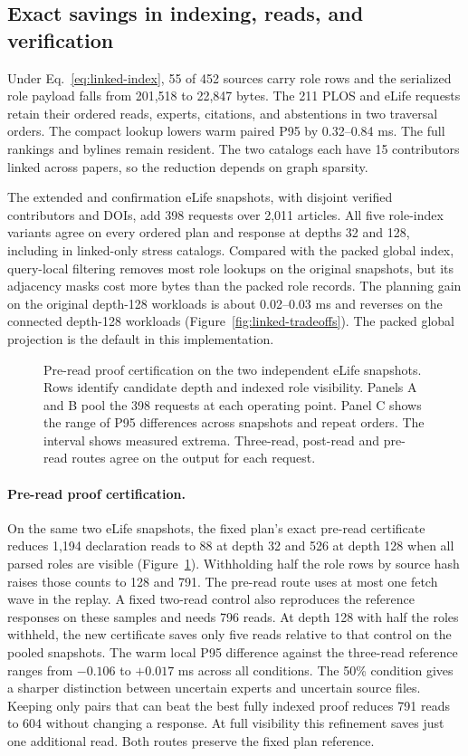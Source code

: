\documentclass[sigconf,natbib=true,anonymous=true,pbalance=true]{acmart}
\begin{document}
\subsection{Exact savings in indexing, reads, and verification}
Under Eq.~\ref{eq:linked-index}, 55 of 452 sources carry role rows and the serialized role payload falls from 201,518 to 22,847 bytes. The 211 PLOS and eLife requests retain their ordered reads, experts, citations, and abstentions in two traversal orders. The compact lookup lowers warm paired P95 by 0.32--0.84 ms. The full rankings and bylines remain resident. The two catalogs each have 15 contributors linked across papers, so the reduction depends on graph sparsity.

The extended and confirmation eLife snapshots, with disjoint verified contributors and DOIs, add 398 requests over 2,011 articles. All five role-index variants agree on every ordered plan and response at depths 32 and 128, including in linked-only stress catalogs. Compared with the packed global index, query-local filtering removes most role lookups on the original snapshots, but its adjacency masks cost more bytes than the packed role records. The planning gain on the original depth-128 workloads is about 0.02--0.03 ms and reverses on the connected depth-128 workloads (Figure~\ref{fig:linked-tradeoffs}). The packed global projection is the default in this implementation.

\begin{figure}[t]
\centering

\caption{Pre-read proof certification on the two independent eLife snapshots. Rows identify candidate depth and indexed role visibility. Panels A and B pool the 398 requests at each operating point. Panel C shows the range of P95 differences across snapshots and repeat orders. The interval shows measured extrema. Three-read, post-read and pre-read routes agree on the output for each request.}
\label{fig:pre-read}
\end{figure}

\paragraph{Pre-read proof certification.}
On the same two eLife snapshots, the fixed plan's exact pre-read certificate reduces 1,194 declaration reads to 88 at depth 32 and 526 at depth 128 when all parsed roles are visible (Figure~\ref{fig:pre-read}). Withholding half the role rows by source hash raises those counts to 128 and 791. The pre-read route uses at most one fetch wave in the replay. A fixed two-read control also reproduces the reference responses on these samples and needs 796 reads. At depth 128 with half the roles withheld, the new certificate saves only five reads relative to that control on the pooled snapshots. The warm local P95 difference against the three-read reference ranges from $-0.106$ to $+0.017$ ms across all conditions. The 50\% condition gives a sharper distinction between uncertain experts and uncertain source files. Keeping only pairs that can beat the best fully indexed proof reduces 791 reads to 604 without changing a response. At full visibility this refinement saves just one additional read. Both routes preserve the fixed plan reference.
\end{document}
